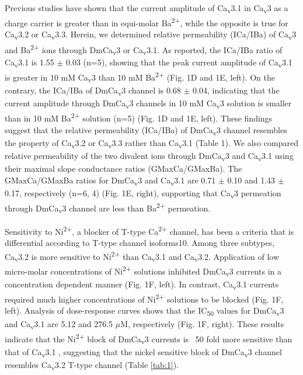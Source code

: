 Previous studies have shown that the current amplitude of Ca\textsubscript{v}3.1 in Ca\textsubscript{v}3 as a charge carrier is greater than in equi-molar Ba\textsuperscript{2+}, while the opposite is true for Ca\textsubscript{v}3.2 or Ca\textsubscript{v}3.3\cite{mcrory:2000aa,shcheglovitov:2007aa}.
Herein, we determined relative permeability (ICa/IBa) of Ca\textsubscript{v}3 and Ba\textsuperscript{2+} ions through DmCa\textsubscript{v}3 or Ca\textsubscript{v}3.1.
As reported, the ICa/IBa ratio of Ca\textsubscript{v}3.1 is 1.55 $\pm$ 0.03 (n=5), showing that the peak current amplitude of Ca\textsubscript{v}3.1 is greater in 10 mM Ca\textsubscript{v}3 than 10 mM Ba\textsuperscript{2+} (Fig. 1D and 1E, left).
On the contrary, the ICa/IBa of DmCa\textsubscript{v}3 channel is 0.68 $\pm$ 0.04, indicating that the current amplitude through DmCa\textsubscript{v}3 channels in 10 mM Ca\textsubscript{v}3 solution is smaller than in 10 mM Ba\textsuperscript{2+} solution (n=5) (Fig. 1D and 1E, left).
These findings suggest that the relative permeability (ICa/IBa) of DmCa\textsubscript{v}3 channel resembles the property of Ca\textsubscript{v}3.2 or Ca\textsubscript{v}3.3 rather than Ca\textsubscript{v}3.1 (Table 1).
We also compared relative permeability of the two divalent ions through DmCa\textsubscript{v}3 and Ca\textsubscript{v}3.1 using their maximal slope conductance ratios (GMaxCa/GMaxBa).
The GMaxCa/GMaxBa ratios for DmCa\textsubscript{v}3 and Ca\textsubscript{v}3.1 are 0.71 $\pm$ 0.10 and 1.43 $\pm$ 0.17, respectively (n=6, 4) (Fig. 1E, right), supporting that Ca\textsubscript{v}3 permeation through DmCa\textsubscript{v}3 channel are less than Ba\textsuperscript{2+} permeation.

Sensitivity to Ni\textsuperscript{2+}, a blocker of T-type Ca\textsuperscript{2+} channel, has been a criteria that is differential according to T-type channel isoforms10.
Among three subtypes, Ca\textsubscript{v}3.2 is more sensitive to Ni\textsuperscript{2+} than Ca\textsubscript{v}3.1 and Ca\textsubscript{v}3.2.
Application of low micro-molar concentrations of Ni\textsuperscript{2+} solutions inhibited DmCa\textsubscript{v}3 currents in a concentration dependent manner (Fig. 1F, left).
In contrast, Ca\textsubscript{v}3.1 currents required much higher concentrations of Ni\textsuperscript{2+} solutions to be blocked (Fig. 1F, left).
Analysis of dose-response curves shows that the IC\textsubscript{50} values for DmCa\textsubscript{v}3 and Ca\textsubscript{v}3.1 are 5.12 and 276.5 $\mu$M, respectively (Fig. 1F, right).
These results indicate that the Ni\textsuperscript{2+} block of DmCa\textsubscript{v}3 currents is ~50 fold more sensitive than that of Ca\textsubscript{v}3.1 , suggesting that the nickel sensitive block of DmCa\textsubscript{v}3 channel resembles Ca\textsubscript{v}3.2 T-type channel (Table \ref{tab:1}).
    
    
    
    
    
    
    
    
    
    
    
    
    